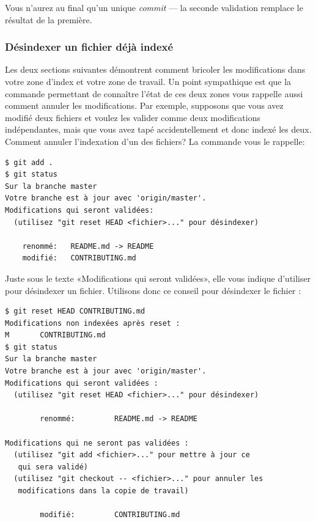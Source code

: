 Vous n'aurez au final qu'un unique \emph{commit} --- la seconde validation remplace le résultat de la première.

\subsubsection{Désindexer un fichier déjà indexé}
\label{sec:git:unstaging}

Les deux sections suivantes démontrent comment bricoler les modifications dans votre zone d'index et votre zone de travail.
Un point sympathique est que la commande permettant de connaître l'état de ces deux zones vous rappelle aussi comment annuler les modifications.
Par exemple, supposons que vous avez modifié deux fichiers et voulez les valider comme deux modifications indépendantes, mais que vous avez tapé accidentellement  et donc indexé les deux.
Comment annuler l'indexation d'un des fichiers? La commande  vous le rappelle:
\begin{Schunk}
\begin{Verbatim}
$ git add .
$ git status
Sur la branche master
Votre branche est à jour avec 'origin/master'.
Modifications qui seront validées:
  (utilisez "git reset HEAD <fichier>..." pour désindexer)

    renommé:   README.md -> README
    modifié:   CONTRIBUTING.md
\end{Verbatim}
\end{Schunk}

Juste sous le texte «Modifications qui seront validées», elle vous indique d'utiliser  pour désindexer un fichier.
Utilisons donc ce conseil pour désindexer le fichier :
\begin{Schunk}
\begin{Verbatim}
$ git reset HEAD CONTRIBUTING.md
Modifications non indexées après reset :
M       CONTRIBUTING.md
$ git status
Sur la branche master
Votre branche est à jour avec 'origin/master'.
Modifications qui seront validées :
  (utilisez "git reset HEAD <fichier>..." pour désindexer)

        renommé:         README.md -> README

Modifications qui ne seront pas validées :
  (utilisez "git add <fichier>..." pour mettre à jour ce
   qui sera validé)
  (utilisez "git checkout -- <fichier>..." pour annuler les
   modifications dans la copie de travail)

        modifié:         CONTRIBUTING.md
\end{Verbatim}
\end{Schunk}

